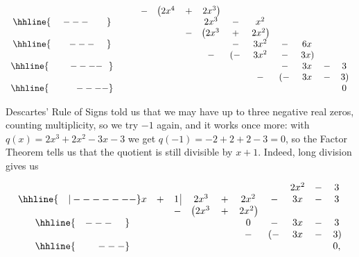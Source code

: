 {\begin{enumerate}
{\[\begin{array}{ccccccccccccc}
  &  &  &  -& \left(2x^4 \right.& + & \left.2x^3\right) &  &  &  &  &    \\ \hhline{~~~~---~~~~~~} 
  &  &  &   &    &   &  2x^3    & - & x^2 &  &  &  &  \\ 
  &  &  &   &    & - &  \left(2x^3\right. & +  & \left. 2x^2\right) & &  &  &     \\ 
\hhline{~~~~~~---~~~~} 
  &  &  &   &    &   &                    &  - & 3x^2 & - & 6x & & \\
  &  &  &   &    &   &                  - &\left(-\right. & 3x^2 & - & \left.3x\right) & & \\
 \hhline{~~~~~~~----~~}   
  &  &  &   &    &   &  &  &  & - & 3x & - &3 \\
  &  &  &   &    &   &  &  & - &\left(-\right. & 3x & - & \left.3\right)\\
 \hhline{~~~~~~~~~----}
  &  &  &   &    &   &  &  &   &               &    &   & 0 

 \end{array}\]
 
\setlength\arraycolsep{5pt}
\setlength\extrarowheight{0pt}

Descartes' Rule of Signs told us that we may have up to three negative real zeros, counting multiplicity, so we try $-1$ again, and it works once more: with $q(x) = 2x^3+2x^2-3x-3$ we get $q(-1) = -2+2+2-3=0$, so the Factor Theorem tells us that the quotient is still divisible by $x+1$. Indeed, long division gives us 

\setlength\arraycolsep{0.1pt}
\setlength\extrarowheight{2pt}

\[ \begin{array}{cccccccccc}

& & & & & & & 2x^2 & - & 3 \\ \hhline{~~~|-------}

x & + & 1 \, \vline& 2x^3 & + & 2x^2 & - & 3x & - & 3\\

 &  &  -& \left(2x^3 \right. & + & \left.  2x^2\right) &  &  &  &  \\ \hhline{~~~---~~~~} 
 &  &  &   &   & 0 & - & 3x  & - & 3 \\ 
 &  &  &   &   & - & \left(-\right. & 3x & - & \left.3\right) \\  \hhline{~~~~~~~---} 
 &   &  &  &  &  &  &  &  & 0,
 
\end{array}\]

\setlength\arraycolsep{5pt}
\setlength\extrarowheight{0pt}

}
\end{enumerate}}
